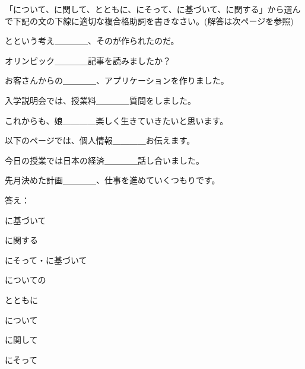 
\author{Marko Miličić,Željka Ludošan}



		
	\begin{mondai}{「について、に関して、とともに、にそって、に基づいて、に関する」から選んで下記の文の下線に適切な複合格助詞を書きなさい。(解答は次ページを参照)}
		\item {}とという考え＿＿＿＿、そのが作られたのだ。	
		\item オリンピック＿＿＿＿記事を読みましたか？	
		\item お客さんからの＿＿＿＿、アプリケーションを作りました。
		\item 入学説明会では、授業料＿＿＿＿質問をしました。
		\item これからも、娘＿＿＿＿楽しく生きていきたいと思います。
		\item 以下のページでは、個人情報＿＿＿＿お伝えます。
		\item 今日の授業では日本の経済＿＿＿＿話し合いました。
		\item 先月決めた計画＿＿＿＿、仕事を進めていくつもりです。
	\end{mondai}
	
	\newpage
	\begin{mondai}{答え：}
		\item に基づいて
		\item に関する
		\item にそって・に基づいて
		\item についての
		\item とともに
		\item について
		\item に関して
		\item にそって
		

	\end{mondai}
	

